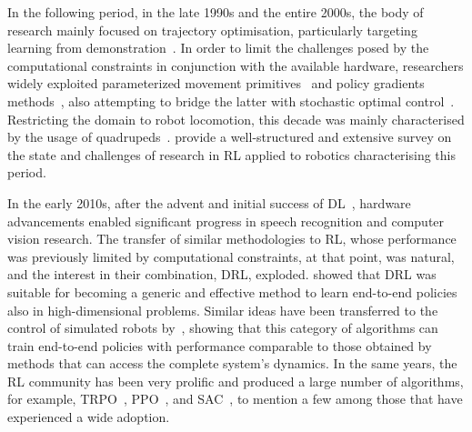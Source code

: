 In the following period, in the late 1990s and the entire 2000s, the body of research mainly focused on trajectory optimisation, particularly targeting learning from demonstration~\parencite{schaal_learning_1996,  atkeson_robot_1997, schaal_is_1999}.
In order to limit the challenges posed by the computational constraints in conjunction with the available hardware, researchers widely exploited parameterized movement primitives~\parencite{schaal_dynamic_2006} and policy gradients methods~\parencite{peters_reinforcement_2003, peters_policy_2006, kober_policy_2008}, also attempting to bridge the latter with stochastic optimal control~\parencite{theodorou_generalized_2010}.
Restricting the domain to robot locomotion, this decade was mainly characterised by the usage of quadrupeds~\parencite{kohl_policy_2004, honglak_lee_quadruped_2006, kolter_hierarchical_2007, theodorou_reinforcement_2010}.
\textcite{koberReinforcementLearningRobotics2013} provide a well-structured and extensive survey on the state and challenges of research in \ac{RL} applied to robotics characterising this period.

In the early 2010s, after the advent and initial success of \ac{DL}~\parencite{hinton_fast_2006}, hardware advancements enabled significant progress in speech recognition and computer vision research.
The transfer of similar methodologies to \ac{RL}, whose performance was previously limited by computational constraints, at that point, was natural, and the interest in their combination, \ac{DRL}, exploded.
\textcite{mnih_human-level_2015} showed that \ac{DRL} was suitable for becoming a generic and effective method to learn end-to-end policies also in high-dimensional problems.
Similar ideas have been transferred to the control of simulated robots by~\textcite{lillicrap_continuous_2016}, showing that this category of algorithms can train end-to-end policies with performance comparable to those obtained by methods that can access the complete system's dynamics.
In the same years, the \ac{RL} community has been very prolific and produced a large number of algorithms, for example, \ac{TRPO}~\parencite{schulman_trust_2017}, \ac{PPO}~\parencite{schulman_proximal_2017}, and \ac{SAC}~\parencite{haarnoja_soft_2018}, to mention a few among those that have experienced a wide adoption.

